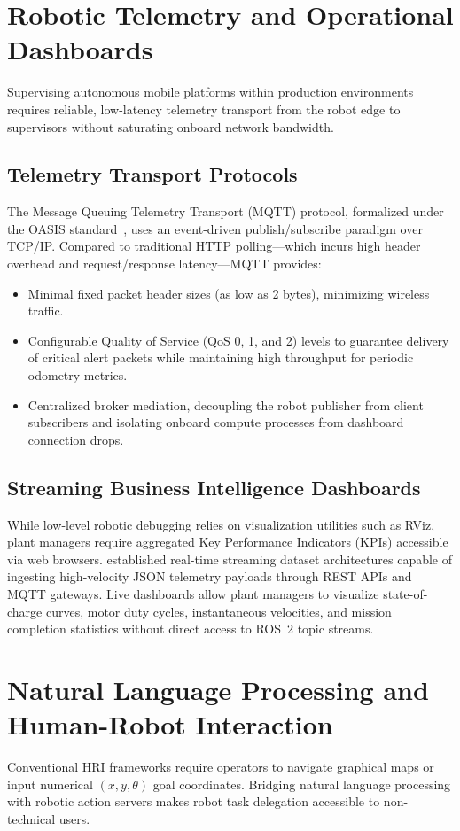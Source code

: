 \section{Robotic Telemetry and Operational Dashboards}
Supervising autonomous mobile platforms within production environments requires reliable, low-latency telemetry transport from the robot edge to supervisors without saturating onboard network bandwidth.

\subsection{Telemetry Transport Protocols}
The Message Queuing Telemetry Transport (MQTT) protocol, formalized under the OASIS standard~\citep{oasis2019mqtt}, uses an event-driven publish/subscribe paradigm over TCP/IP. Compared to traditional HTTP polling—which incurs high header overhead and request/response latency—MQTT provides:
\begin{itemize}
    \item Minimal fixed packet header sizes (as low as 2 bytes), minimizing wireless traffic.
    \item Configurable Quality of Service (QoS 0, 1, and 2) levels to guarantee delivery of critical alert packets while maintaining high throughput for periodic odometry metrics.
    \item Centralized broker mediation, decoupling the robot publisher from client subscribers and isolating onboard compute processes from dashboard connection drops.
\end{itemize}

\subsection{Streaming Business Intelligence Dashboards}
While low-level robotic debugging relies on visualization utilities such as RViz, plant managers require aggregated Key Performance Indicators (KPIs) accessible via web browsers. \citet{microsoft2024powerbi} established real-time streaming dataset architectures capable of ingesting high-velocity JSON telemetry payloads through REST APIs and MQTT gateways. Live dashboards allow plant managers to visualize state-of-charge curves, motor duty cycles, instantaneous velocities, and mission completion statistics without direct access to ROS~2 topic streams.

\section{Natural Language Processing and Human-Robot Interaction}
Conventional HRI frameworks require operators to navigate graphical maps or input numerical $(x, y, \theta)$ goal coordinates. Bridging natural language processing with robotic action servers makes robot task delegation accessible to non-technical users.

